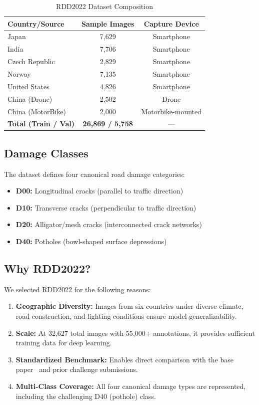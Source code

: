 \documentclass[conference]{IEEEtran}
\begin{document}
\begin{table}[!t]
\centering
\caption{RDD2022 Dataset Composition}
\label{tab:dataset}
\renewcommand{\arraystretch}{1.1}
\begin{tabular}{@{}lcc@{}}
\toprule
\textbf{Country/Source} & \textbf{Sample Images} & \textbf{Capture Device} \\
\midrule
Japan & 7,629 & Smartphone \\
India & 7,706 & Smartphone \\
Czech Republic & 2,829 & Smartphone \\
Norway & 7,135 & Smartphone \\
United States & 4,826 & Smartphone \\
China (Drone) & 2,502 & Drone \\
China (MotorBike) & 2,000 & Motorbike-mounted \\
\midrule
\textbf{Total (Train / Val)} & \textbf{26,869 / 5,758} & --- \\
\bottomrule
\end{tabular}
\end{table}

\subsection{Damage Classes}
The dataset defines four canonical road damage categories:
\begin{itemize}[leftmargin=*]
    \item \textbf{D00:} Longitudinal cracks (parallel to traffic direction)
    \item \textbf{D10:} Transverse cracks (perpendicular to traffic direction)
    \item \textbf{D20:} Alligator/mesh cracks (interconnected crack networks)
    \item \textbf{D40:} Potholes (bowl-shaped surface depressions)
\end{itemize}

\subsection{Why RDD2022?}
We selected RDD2022 for the following reasons:
\begin{enumerate}[leftmargin=*]
    \item \textbf{Geographic Diversity:} Images from six countries under diverse climate, road construction, and lighting conditions ensure model generalizability.
    \item \textbf{Scale:} At 32,627 total images with 55,000+ annotations, it provides sufficient training data for deep learning.
    \item \textbf{Standardized Benchmark:} Enables direct comparison with the base paper~\cite{zeng2024yolov8pd} and prior challenge submissions.
    \item \textbf{Multi-Class Coverage:} All four canonical damage types are represented, including the challenging D40 (pothole) class.
\end{enumerate}
\end{document}
